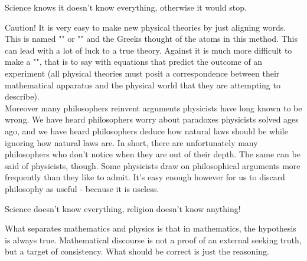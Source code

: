 	\begin{fquote}Science knows it doesn't know everything, otherwise it would stop.
 	\end{fquote}

	\begin{tcolorbox}[colback=red!5,borderline={1mm}{2mm}{red!5},arc=0mm,boxrule=0pt]
	\bcbombe Caution! It is very easy to make new physical theories by just aligning words. This is named "" or "" and the Greeks thought of the atoms in this method. This can lead with a lot of luck to a true theory. Against it is much more difficult to make a "", that is to say with equations that predict the outcome of an experiment (all physical theories must posit a correspondence between their mathematical apparatus and the physical world that they are attempting to describe).\\
	
	Moreover many philosophers reinvent arguments physicists have long known to be wrong. We have heard philosophers worry about paradoxes physicists solved ages ago, and we have heard philosophers deduce how natural laws should be while ignoring how natural laws are. In short, there are unfortunately many philosophers who don't notice when they are out of their depth. The same can be said of physicists, though. Some physicists draw on philosophical arguments more frequently than they like to admit. It's easy enough however for us to discard philosophy as useful -
because it is useless.
	\end{tcolorbox}
	
	\begin{fquote}Science doesn't know everything, religion doesn't know anything!
 	\end{fquote}

	\begin{tcolorbox}[title=Remark,colframe=black,arc=10pt]
	What separates mathematics and physics is that in mathematics, the hypothesis is always true. Mathematical discourse is not a proof of an external seeking truth, but a target of consistency. What should be correct is just the reasoning. 
	\end{tcolorbox}

